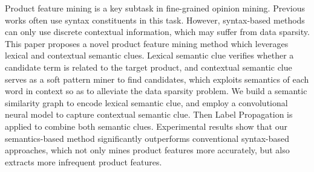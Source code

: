 Product feature mining is a key subtask in fine-grained opinion mining. Previous works often use syntax constituents in this task. However, syntax-based methods can only use discrete contextual information, which may suffer from data sparsity. This paper proposes a novel product feature mining method which leverages lexical and contextual semantic clues. Lexical semantic clue verifies whether a candidate term is related to the target product, and contextual semantic clue serves as a soft pattern miner to find candidates, which exploits semantics of each word in context so as to alleviate the data sparsity problem. We build a semantic similarity graph to encode lexical semantic clue, and employ a convolutional neural model to capture contextual semantic clue. Then Label Propagation is applied to combine both semantic clues. Experimental results show that our semantics-based method significantly outperforms conventional syntax-based approaches, which not only mines product features more accurately, but also extracts more infrequent product features.
